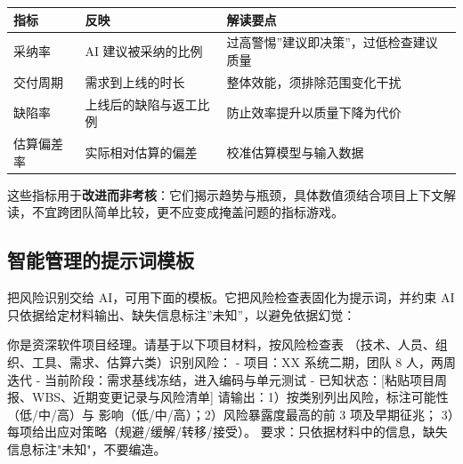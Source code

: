 \documentclass[
]{ctexbook}
\newenvironment{Shaded}{
  \ttfamily\small
}{}
\newcommand{\NormalTok}[1]{#1}
\newcounter{none}
\begin{document}
{\def\LTcaptype{none} %
\begin{longtable}[]{@{}
  >{\raggedright\arraybackslash}p{}
  >{\raggedright\arraybackslash}p{}
  >{\raggedright\arraybackslash}p{}@{}}
\toprule\noalign{}
\begin{minipage}[b]{\linewidth}\raggedright
指标
\end{minipage} & \begin{minipage}[b]{\linewidth}\raggedright
反映
\end{minipage} & \begin{minipage}[b]{\linewidth}\raggedright
解读要点
\end{minipage} \\
\midrule\noalign{}
\endhead
\bottomrule\noalign{}
\endlastfoot
采纳率 & AI 建议被采纳的比例 &
过高警惕''建议即决策''，过低检查建议质量 \\
交付周期 & 需求到上线的时长 & 整体效能，须排除范围变化干扰 \\
缺陷率 & 上线后的缺陷与返工比例 & 防止效率提升以质量下降为代价 \\
估算偏差率 & 实际相对估算的偏差 & 校准估算模型与输入数据 \\
\end{longtable}
}

这些指标用于\textbf{改进而非考核}：它们揭示趋势与瓶颈，具体数值须结合项目上下文解读，不宜跨团队简单比较，更不应变成掩盖问题的指标游戏。

\subsection{智能管理的提示词模板}\label{ux667aux80fdux7ba1ux7406ux7684ux63d0ux793aux8bcdux6a21ux677f}

把风险识别交给 AI，可用下面的模板。它把风险检查表固化为提示词，并约束 AI
只依据给定材料输出、缺失信息标注''未知''，以避免依据幻觉：

\begin{Shaded}
\begin{Highlighting}[]
\NormalTok{你是资深软件项目经理。请基于以下项目材料，按风险检查表}
\NormalTok{（技术、人员、组织、工具、需求、估算六类）识别风险：}
\NormalTok{{-} 项目：XX 系统二期，团队 8 人，两周迭代}
\NormalTok{{-} 当前阶段：需求基线冻结，进入编码与单元测试}
\NormalTok{{-} 已知状态：[粘贴项目周报、WBS、近期变更记录与风险清单]}
\NormalTok{请输出：1）按类别列出风险，标注可能性（低/中/高）与}
\NormalTok{影响（低/中/高）；2）风险暴露度最高的前 3 项及早期征兆；}
\NormalTok{3）每项给出应对策略（规避/缓解/转移/接受）。}
\NormalTok{要求：只依据材料中的信息，缺失信息标注"未知"，不要编造。}
\end{Highlighting}
\end{Shaded}
\end{document}
